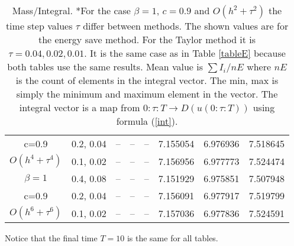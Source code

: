\documentclass{article}
\newcommand{\rf}[1]{(\ref{#1})}
\begin{document}
\begin{table}[ht]
\begin{tabular}{||c|l|l|l|l|l|l|l||}
       c=0.9                      & 0.2, 0.04    & --  & --  & -- &  7.155054       & 6.976936  & 7.518645  \\
       $O(h^4+ \tau^4)$ & 0.1, 0.02   & --  & --  & -- &  7.156956       & 6.977773  & 7.524474   \\
    \hline
  $\beta=1$                   & 0.4, 0.08        & --  & --  & -- &  7.151929       & 6.975851  & 7.507948  \\
      c=0.9                       & 0.2, 0.04        & --  & --  & -- & 7.156091       & 6.977917  & 7.519799   \\
     $O(h^6+ \tau^6)$   & 0.1, 0.02        & --  & --  & --   & 7.157036       & 6.977836  & 7.524591  \\
	   		\hline
			\hline 
		\end{tabular}
		\caption{ Mass/Integral. *For the case  $\beta=1$, $c=0.9$ and $O(h^2+ \tau^2)$ the time step values $\tau$ differ between methods. The shown values are for the energy save method. For the Taylor method it is $\tau = 0.04, 0.02, 0.01 $. It is the same case as in Table \ref{tableE} because both tables use the same results. Mean value is $ \sum I_i / nE $ where $nE$ is the count of elements in the integral vector. The min, max is simply the minimum and maximum element in the vector. The integral vector is a map from $0:\tau:T \rightarrow D(u(0:\tau:T))$ using formula \rf{int}. }
\label{tableF}
\end{table}
Notice that the final time $T=10$  is the same for all tables.
\end{document}
